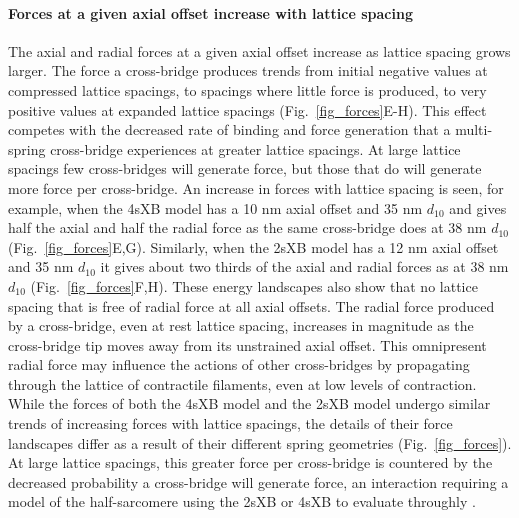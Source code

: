 \documentclass[11pt,titlepage]{article}
\begin{document}
\paragraph{Forces at a given axial offset increase with lattice spacing} %
The axial and radial forces at a given axial offset increase as lattice spacing grows larger.
The force a cross-bridge produces trends from initial negative values at compressed lattice spacings, to spacings where little force is produced, to very positive values at expanded lattice spacings (Fig.~\ref{fig_forces}E-H). 
This effect competes with the decreased rate of binding and force generation that a multi-spring cross-bridge experiences at greater lattice spacings. 
At large lattice spacings few cross-bridges will generate force, but those that do will generate more force per cross-bridge. 
An increase in forces with lattice spacing is seen, for example, when the 4sXB model has a 10 nm axial offset and 35 nm $d_{10}$  and gives half the axial and half the radial force as the same cross-bridge does at 38 nm $d_{10}$ (Fig.~\ref{fig_forces}E,G). 
Similarly, when the 2sXB model has a 12 nm axial offset and 35 nm $d_{10}$ it gives about two thirds of the axial and radial forces as at 38 nm $d_{10}$ (Fig.~\ref{fig_forces}F,H).  
These energy landscapes also show that no lattice spacing that is free of radial force at all axial offsets.  
The radial force produced by a cross-bridge, even at rest lattice spacing, increases in magnitude as the cross-bridge tip moves away from its unstrained axial offset. 
This omnipresent radial force may influence the actions of other cross-bridges by propagating through the lattice of contractile filaments, even at low levels of contraction.
While the forces of both the 4sXB model and the 2sXB model undergo similar trends of increasing forces with lattice spacings, the details of their force landscapes differ as a result of their different spring geometries (Fig.~\ref{fig_forces}). 
At large lattice spacings, this greater force per cross-bridge is countered by the decreased probability a cross-bridge will generate force, an interaction requiring a model of the half-sarcomere using the 2sXB or 4sXB to evaluate throughly \citep{Martyn2004}. 
\end{document}

